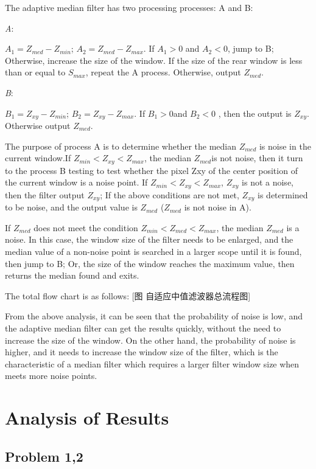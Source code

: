 \documentclass{mcmthesis}
\begin{document}
The adaptive median filter has two processing processes: A and B:

\emph{A}:

$A_1 = Z_{med}−Z_{min}$;   
$A_2 = Z_{med}−Z_{max}$.  
If $A_1 > 0$ and $A_2 < 0$, jump to B;
Otherwise, increase the size of the window.
If the size of the rear window is less than or equal to $S_{max}$, repeat the A process.
Otherwise, output $Z_{med}$.

\emph{B}:

$B_1 = Z_{xy}−Z_{min}$;  
$B_2 = Z_{xy}−Z_{max}$.  
If $B_1>0$and $B_2<0$ , then the output is $Z_{xy}$.
Otherwise output $Z_{med}$.


The purpose of process A is to determine whether the median $Z_{med}$ is noise in the current window.If $Z_{min} < Z_{xy} < Z_{max}$, the median $Z_{med}$is not noise, then it turn to the process B testing to test whether the pixel Zxy of the center position of the current window is a noise point.
If $Z_{min} < Z_{xy} < Z_{max}$, $Z_{xy}$ is not a noise, then the filter output $Z_{xy}$; If the above conditions are not met, $Z_{xy}$ is determined to be noise, and the output value is $Z_{med}$ ($Z_{med}$ is not noise in A).

If $Z_{med}$ does not meet the condition $Z_{min}<Z_{med}<Z_{max}$, the median $Z_{med}$ is a noise. In this case, the window size of the filter needs to be enlarged, and the median value of a non-noise point is searched in a larger scope until it is found, then jump to B; Or, the size of the window reaches the maximum value, then returns the median found and exits.

The total flow chart is as follows:
[图  自适应中值滤波器总流程图]

From the above analysis, it can be seen that the probability of noise is low, and the adaptive median filter can get the results quickly, without the need to increase the size of the window. On the other hand, the probability of noise is higher, and it needs to increase the window size of the filter, which is the characteristic of a median filter which requires a larger filter window size when meets more noise points.

\section{Analysis of Results}
\subsection{Problem 1,2}
\end{document}
